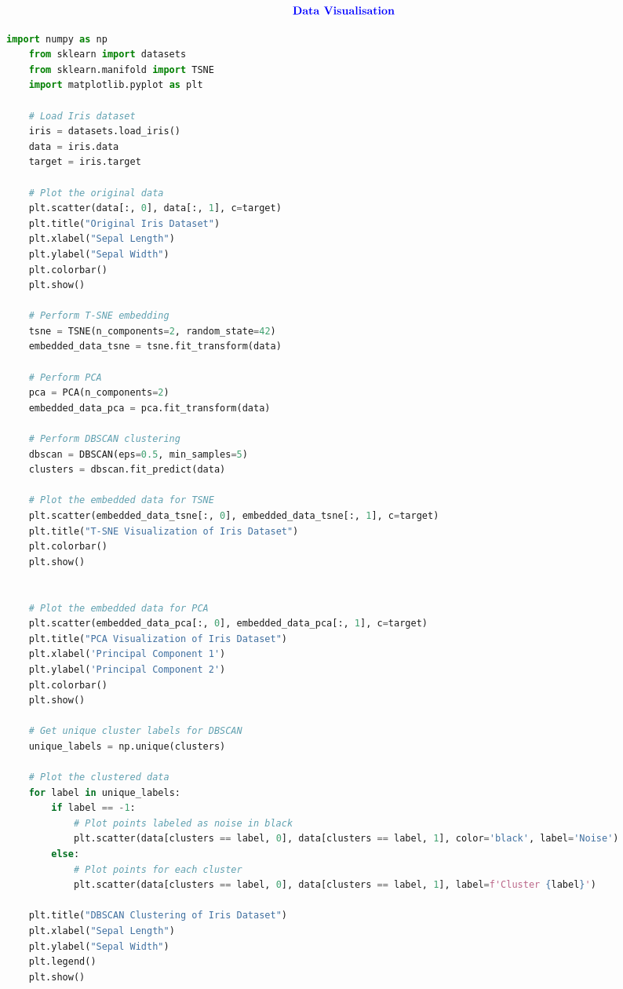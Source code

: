 \documentclass[12pt,a4paper]{article}
\begin{document}
{\begin{align*}
   \textcolor{blue}{ \text{{\textbf{Data Visualisation}}}}
\end{align*}

\begin{lstlisting}[language=python, style = mystyle]
    import numpy as np
    from sklearn import datasets
    from sklearn.manifold import TSNE
    import matplotlib.pyplot as plt

    # Load Iris dataset
    iris = datasets.load_iris()
    data = iris.data
    target = iris.target
    
    # Plot the original data
    plt.scatter(data[:, 0], data[:, 1], c=target)
    plt.title("Original Iris Dataset")
    plt.xlabel("Sepal Length")
    plt.ylabel("Sepal Width")
    plt.colorbar()
    plt.show()
    
    # Perform T-SNE embedding
    tsne = TSNE(n_components=2, random_state=42)
    embedded_data_tsne = tsne.fit_transform(data)

    # Perform PCA
    pca = PCA(n_components=2)
    embedded_data_pca = pca.fit_transform(data)

    # Perform DBSCAN clustering
    dbscan = DBSCAN(eps=0.5, min_samples=5)
    clusters = dbscan.fit_predict(data)

    # Plot the embedded data for TSNE
    plt.scatter(embedded_data_tsne[:, 0], embedded_data_tsne[:, 1], c=target)
    plt.title("T-SNE Visualization of Iris Dataset")
    plt.colorbar()
    plt.show()

    
    # Plot the embedded data for PCA
    plt.scatter(embedded_data_pca[:, 0], embedded_data_pca[:, 1], c=target)
    plt.title("PCA Visualization of Iris Dataset")
    plt.xlabel('Principal Component 1')
    plt.ylabel('Principal Component 2')
    plt.colorbar()
    plt.show()

    # Get unique cluster labels for DBSCAN
    unique_labels = np.unique(clusters)
    
    # Plot the clustered data
    for label in unique_labels:
        if label == -1:
            # Plot points labeled as noise in black
            plt.scatter(data[clusters == label, 0], data[clusters == label, 1], color='black', label='Noise')
        else:
            # Plot points for each cluster
            plt.scatter(data[clusters == label, 0], data[clusters == label, 1], label=f'Cluster {label}')
    
    plt.title("DBSCAN Clustering of Iris Dataset")
    plt.xlabel("Sepal Length")
    plt.ylabel("Sepal Width")
    plt.legend()
    plt.show()
\end{lstlisting}

}
\end{document}
